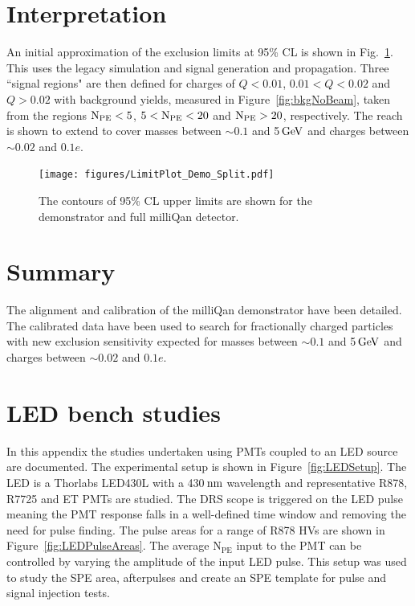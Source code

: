 \documentclass[12pt]{article}
\newcommand{\unit}[1]{\ensuremath{\text{\,#1}}\xspace}
\newcommand{\npe} {\mbox{\ensuremath{\textrm{N}_\textrm{PE}}}\xspace}
\begin{document}
\newpage

\section{Interpretation}

An initial approximation of the exclusion limits at 95\% CL 
is shown in Fig.~\ref{fig:limitPlot}. This uses the legacy simulation
and signal generation and propagation. Three ``signal regions" are then defined for charges
of $Q<0.01$, $0.01 < Q < 0.02$ and $Q > 0.02$ with background yields, measured in 
Figure~\ref{fig:bkgNoBeam}, taken from the regions $\npe < 5$, $5 < \npe < 
20$ and $\npe > 20$, respectively. The reach is shown to extend to cover masses between
$\sim0.1$ and 5\unit{GeV} and charges between $\sim0.02$ and $0.1e$.

\begin{figure}[ht!]
    \centering
    \texttt{[image: figures/LimitPlot\_Demo\_Split.pdf]}
    \caption{\label{fig:limitPlot} The contours of 95\% CL upper limits
    are shown for the demonstrator and full milliQan detector.}
\end{figure}

\section{Summary}

The alignment and calibration of the milliQan demonstrator have been detailed. The calibrated
data have been used to search for fractionally charged particles with new 
exclusion sensitivity expected for masses between $\sim0.1$ and 5\unit{GeV} 
and charges between $\sim0.02$ and $0.1e$.

\appendix
\section{LED bench studies}
\label{app:speLEDCalib}
In this appendix the studies undertaken using PMTs coupled to an LED source are documented.
The experimental setup is shown in Figure~\ref{fig:LEDSetup}. The LED is a Thorlabs LED430L with a 430\unit{nm} wavelength 
and representative R878, R7725 and ET PMTs are studied. The DRS scope is triggered on
the LED pulse meaning the PMT response falls in a well-defined time window 
and removing the need for pulse finding. The pulse areas for a range of R878 HVs are
shown in Figure~\ref{fig:LEDPulseAreas}. The average \npe input to the PMT can be controlled by varying the amplitude of the input LED pulse.
This setup was used to study the SPE area, afterpulses and create an SPE template for 
pulse and signal injection tests. 
\end{document}
